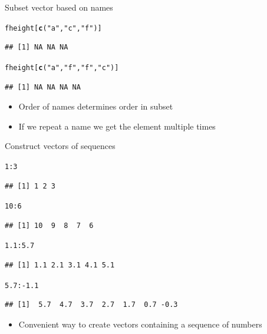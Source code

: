 \documentclass{beamer}\usepackage[]{graphicx}\usepackage[]{color}
\makeatletter
\newcommand{\hlnum}[1]{\textcolor[rgb]{0.686,0.059,0.569}{#1}}%
\newcommand{\hlstr}[1]{\textcolor[rgb]{0.192,0.494,0.8}{#1}}%
\newcommand{\hlopt}[1]{\textcolor[rgb]{0,0,0}{#1}}%
\newcommand{\hlstd}[1]{\textcolor[rgb]{0.345,0.345,0.345}{#1}}%
\newcommand{\hlkwd}[1]{\textcolor[rgb]{0.737,0.353,0.396}{\textbf{#1}}}%
\newenvironment{kframe}{%
 \def\at@end@of@kframe{}%
 \ifinner\ifhmode%
  \def\at@end@of@kframe{\end{minipage}}%
  \begin{minipage}{\columnwidth}%
 \fi\fi%
 \def\FrameCommand##1{\hskip\@totalleftmargin \hskip-\fboxsep
 \colorbox{shadecolor}{##1}\hskip-\fboxsep
     \hskip-\linewidth \hskip-\@totalleftmargin \hskip\columnwidth}%
 \MakeFramed {\advance\hsize-\width
   \@totalleftmargin\z@ \linewidth\hsize
   \@setminipage}}%
 {\par\unskip\endMakeFramed%
 \at@end@of@kframe}
\newenvironment{knitrout}{}{} %
\renewenvironment{knitrout}{\begin{singlespace}}{\end{singlespace}}
\theoremstyle{mystyle}
\makeatother
\begin{document}
\begin{frame}[fragile]{Subset vector based on names}
\begin{knitrout}
\color{fgcolor}\begin{kframe}
\begin{alltt}
\hlstd{fheight[}\hlkwd{c}\hlstd{(}\hlstr{"a"}\hlstd{,} \hlstr{"c"}\hlstd{,} \hlstr{"f"}\hlstd{)]}
\end{alltt}
\begin{verbatim}
## [1] NA NA NA
\end{verbatim}
\begin{alltt}
\hlstd{fheight[}\hlkwd{c}\hlstd{(}\hlstr{"a"}\hlstd{,} \hlstr{"f"}\hlstd{,} \hlstr{"f"}\hlstd{,} \hlstr{"c"}\hlstd{)]}
\end{alltt}
\begin{verbatim}
## [1] NA NA NA NA
\end{verbatim}
\end{kframe}
\end{knitrout}
\begin{itemize}
\item Order of names determines order in subset 
\item If we repeat a name we get the element multiple times
\end{itemize}
\end{frame}

\begin{frame}[fragile]{Construct vectors of sequences}
\begin{knitrout}
\color{fgcolor}\begin{kframe}
\begin{alltt}
\hlnum{1}\hlopt{:}\hlnum{3}
\end{alltt}
\begin{verbatim}
## [1] 1 2 3
\end{verbatim}
\begin{alltt}
\hlnum{10}\hlopt{:}\hlnum{6}
\end{alltt}
\begin{verbatim}
## [1] 10  9  8  7  6
\end{verbatim}
\begin{alltt}
\hlnum{1.1}\hlopt{:}\hlnum{5.7}
\end{alltt}
\begin{verbatim}
## [1] 1.1 2.1 3.1 4.1 5.1
\end{verbatim}
\begin{alltt}
\hlnum{5.7}\hlopt{:-}\hlnum{1.1}
\end{alltt}
\begin{verbatim}
## [1]  5.7  4.7  3.7  2.7  1.7  0.7 -0.3
\end{verbatim}
\end{kframe}
\end{knitrout}
\begin{itemize}
\item Convenient way to create vectors containing a sequence of numbers
\end{itemize}
\end{frame}
\end{document}
